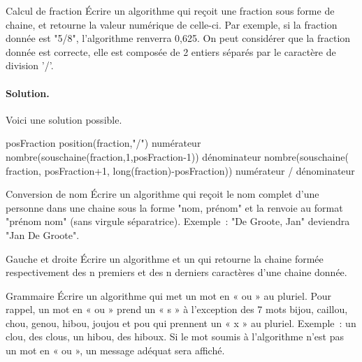 	\begin{Exercice}{Calcul de fraction}
		Écrire un algorithme 
		qui reçoit une fraction sous forme de chaine, 
		et retourne la valeur numérique de celle-ci. 
		Par exemple, si la fraction donnée est "5/8", 
		l’algorithme renverra 0,625. 
		On peut considérer que la fraction donnée est correcte, 
		elle est composée de 2 entiers séparés 
		par le caractère de division '/'.

		\paragraph{Solution.}
		Voici une solution possible.
		\begin{pseudocode}
			\Let posFraction \Gets position(fraction,"/")
			\Let numérateur \Gets nombre(souschaine(fraction,1,posFraction-1))
			\Let dénominateur \Gets nombre(souschaine(
				\Let\Indent fraction,
				\Let\Indent posFraction+1,
				\Let\Indent long(fraction)-posFraction))
			\Return numérateur / dénominateur
		\EndAlgo
	\end{pseudocode}
\end{Exercice}

\begin{Exercice}{Conversion de nom}
	Écrire un algorithme 
	qui reçoit le nom complet d’une personne 
	dans une chaine sous la forme "nom, prénom" 
	et la renvoie au format "prénom nom" 
	(sans virgule séparatrice). 
	Exemple~: "De Groote, Jan" deviendra "Jan De Groote".	
\end{Exercice}

\begin{Exercice}{Gauche et droite}
	Écrire un algorithme  
	et un 
	qui retourne la chaine formée respectivement 
	des n premiers et des n derniers caractères d’une chaine donnée.	
\end{Exercice}

\begin{Exercice}{Grammaire}
	Écrire un algorithme 
	qui met un mot en « ou » au pluriel. 
	Pour rappel, 
	un mot en « ou » prend un « s » à l’exception des 7 mots 
	bijou, caillou, chou, genou, hibou, joujou et pou qui prennent 
	un « x » au pluriel. 
	Exemple~: un clou, des clous, un hibou, des hiboux. 
	Si le mot soumis à l’algorithme n’est pas un mot en « ou », 
	un message adéquat sera affiché.
\end{Exercice}

